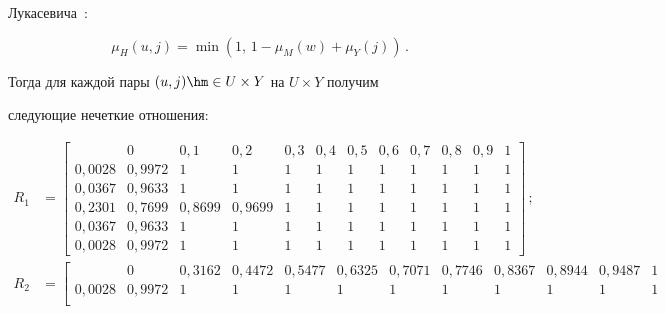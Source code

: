 Лукасевича~\cite{7-rz}:

  \begin{equation*}

  \mu_H(u,j)=\min \left( 1,\,1-\mu_M(w)+\mu_Y(j)\right)\,.


  \end{equation*}

Тогда для каждой пары $(u,j)\hm\in U\times Y$ на $U\times Y$ получим 

следующие нечеткие отношения: 



\noindent

{\footnotesize

\begin{align*}

R_1&=

\left[

\begin{array}{c|ccccccccccc}

 & 0&0{,}1& 0{,}2& 0{,}3& 0{,}4& 0{,}5& 0{,}6& 0{,}7 & 0{,}8& 0{,}9&1\\

 \hline

0{,}0028& 0{,}9972& 1&1&1&1&1& 1&1&1&1&1\\

0{,}0367& 0{,}9633& 1&1&1&1&1&1&1&1&1&1\\

0{,}2301& 0{,}7699& 0{,}8699& 0{,}9699& 1&1&1&1&1&1&1&1\\

0{,}0367 & 0{,}9633& 1&1&1&1&1& 1&1&1&1&1\\

0{,}0028 & 0{,}9972& 1&1&1&1&1& 1&1&1&1&1

\end{array}

\right]\,;

\\[2pt]

R_2&= \left[

\begin{array}{c|ccccccccccc}

&0&0{,}3162& 0{,}4472& 0{,}5477& 0{,}6325& 0{,}7071& 0{,}7746& 

0{,}8367& 0{,}8944& 0{,}9487&1\\

\hline

0{,}0028& 0{,}9972& 1&1&1&1&1& 1&1&1&1&1\\


\end{array}
\end{align*}}
